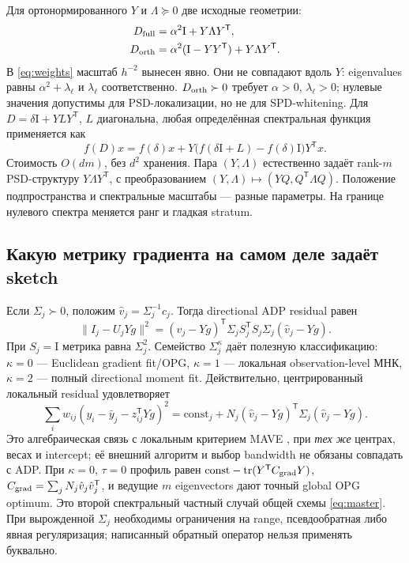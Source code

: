 \documentclass[11pt,a4paper]{article}
\newcommand{\Id}{\mathrm I}
\newcommand{\T}{^{\mathsf T}}
\DeclareMathOperator{\tr}{tr}
\begin{document}
Для ортонормированного $Y$ и $\Lambda\succeq0$ две исходные геометрии:
\begin{align}
 D_{\rm full}&=\alpha^2\Id+Y\Lambda Y\T,\label{eq:fulltensor}\\
 D_{\rm orth}&=\alpha^2(\Id-YY\T)+Y\Lambda Y\T.\label{eq:orthtensor}
\end{align}
В \eqref{eq:weights} масштаб $h^{-2}$ вынесен явно.
Они не совпадают вдоль $Y$: eigenvalues равны
$\alpha^2+\lambda_\ell$ и $\lambda_\ell$ соответственно.
$D_{\rm orth}\succ0$ требует $\alpha>0$, $\lambda_\ell>0$;
нулевые значения допустимы для PSD-локализации, но не для SPD-whitening.
Для $D=\delta\Id+Y L Y\T$, $L$ диагональна, любая определённая
спектральная функция применяется как
\begin{equation}\label{eq:functiontensor}
 f(D)x=f(\delta)x+
       Y\bigl(f(\delta\Id+L)-f(\delta)\Id\bigr)Y\T x.
\end{equation}
Стоимость $O(dm)$, без $d^2$ хранения.
Пара $(Y,\Lambda)$ естественно задаёт rank-$m$ PSD-структуру
$Y\Lambda Y\T$, с преобразованием
$(Y,\Lambda)\mapsto(YQ,Q\T\Lambda Q)$.
Положение подпространства и спектральные масштабы --- разные параметры.
На границе нулевого спектра меняется ранг и гладкая stratum.

\subsection{Какую метрику градиента на самом деле задаёт sketch}
Если $\Sigma_j\succ0$, положим $\hat v_j=\Sigma_j^{-1}c_j$.
Тогда directional ADP residual равен
\begin{equation}\label{eq:sketchmetric}
 \|I_j-U_jYg\|^2=
 (\hat v_j-Yg)\T\Sigma_jS_j\T S_j\Sigma_j(\hat v_j-Yg).
\end{equation}
При $S_j=\Id$ метрика равна $\Sigma_j^2$.
Семейство $\Sigma_j^\kappa$ даёт полезную классификацию:
$\kappa=0$ --- Euclidean gradient fit/OPG,
$\kappa=1$ --- локальная observation-level МНК,
$\kappa=2$ --- полный directional moment fit.
Действительно, центрированный локальный residual удовлетворяет
\begin{equation}\label{eq:mavemetric}
 \sum_iw_{ij}(y_i-\bar y_j-z_{ij}\T Yg)^2
 =\mathrm{const}_j+N_j(\hat v_j-Yg)\T\Sigma_j(\hat v_j-Yg).
\end{equation}
Это алгебраическая связь с локальным критерием MAVE \cite{mave},
при \emph{тех же} центрах, весах и intercept; её внешний алгоритм
и выбор bandwidth не обязаны совпадать с ADP.
При $\kappa=0$, $\tau=0$ профиль равен
$\mathrm{const}-\tr(Y\T C_{\rm grad}Y)$,
$C_{\rm grad}=\sum_jN_j\hat v_j\hat v_j\T$,
и ведущие $m$ eigenvectors дают точный global OPG optimum.
Это второй спектральный частный случай общей схемы \eqref{eq:master}.
При вырожденной $\Sigma_j$ необходимы ограничения на range,
псевдообратная либо явная регуляризация; написанный обратный оператор
нельзя применять буквально.
\end{document}
